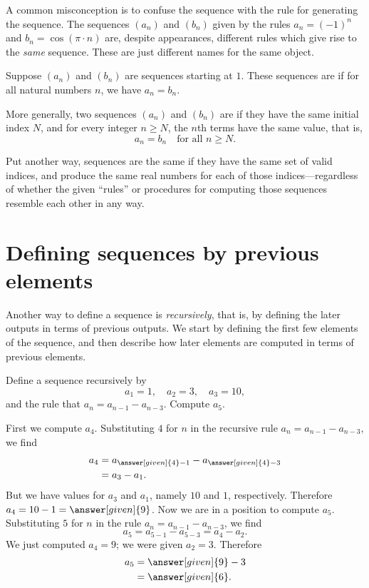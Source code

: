 \documentclass{ximera}
\begin{document}
\begin{warning}
  A common misconception is to confuse the sequence with the rule for
  generating the sequence.  The sequences $(a_n)$ and $(b_n)$ given by
  the rules $a_n = (-1)^n$ and $b_n = \cos (\pi \cdot n)$ are, despite
  appearances, different rules which give rise to the \textit{same}
  sequence.  These are just different names for the same object.
\end{warning}

\begin{definition}
  Suppose $(a_n)$ and $(b_n)$ are sequences starting at $1$.  These
  sequences are  if for all
  natural numbers $n$, we have $a_n = b_n$.

  More generally, two sequences $(a_n)$ and $(b_n)$ are
   if they have the same initial index $N$, and for
  every integer $n \geq N$, the $n$th terms have the same value, that is,
  \[
  a_n = b_n \quad \text{for all $n \geq N$.}
  \]
\end{definition}
Put another way, sequences are the same if they have the same set of
valid indices, and produce the same real numbers for each of those
indices---regardless of whether the given ``rules'' or procedures for
computing those sequences resemble each other in any way.





\section{Defining sequences by previous elements}


Another way to define a sequence is \textit{recursively},
that is, by defining the later outputs in terms of previous outputs.
We start by defining the first few elements of the sequence, and then
describe how later elements are computed in terms of previous
elements.

\begin{example}
Define a sequence recursively by
\[
a_1 = 1, \quad a_2 = 3, \quad a_3 = 10,
\]
and the rule that $a_n = a_{n-1} - a_{n-3}$.  Compute $a_5$.
\begin{explanation}
  First we compute $a_4$.  Substituting $4$ for $n$ in the recursive
  rule $a_n = a_{n-1} - a_{n-3}$, we find
  \begin{align*}
  a_4 &= a_{\answer[given]{4}-1} - a_{\answer[given]{4}-3} \\
  &= a_3 - a_1.
  \end{align*}
  But we have values for $a_3$ and $a_1$, namely $10$ and $1$,
  respectively.  Therefore $a_4 = 10 - 1 = \answer[given]{9}$.  Now we
  are in a position to compute $a_5$.  Substituting $5$ for $n$ in the
  rule $a_n = a_{n-1} - a_{n-3}$, we find
  \[
  a_5 = a_{5-1} - a_{5-3} = a_4 - a_2.
  \]
  We just computed $a_4 = 9$; we were given $a_2 = 3$.  Therefore
  \begin{align*}
    a_5&= \answer[given]{9} - 3 \\
    &= \answer[given]{6}.
  \end{align*}
\end{explanation}
\end{example}
\end{document}
